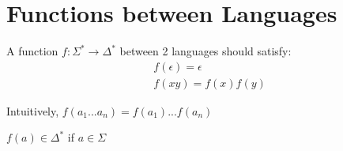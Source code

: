 \section{Functions between Languages} %
\label{sec:functions_between_languages}
\begin{Def}
    A function $f: \Sigma^* \to \Delta^*$ between 2 languages should satisfy:
    \begin{align*}
        &f(\epsilon) = \epsilon\\
        &f(xy) = f(x)f(y)
    \end{align*}
\end{Def}
Intuitively, $f(a_1 ... a_n) = f(a_1)...f(a_n)$
\begin{Rem}
    $f(a) \in \Delta^*$ if $a \in \Sigma$
\end{Rem}



























